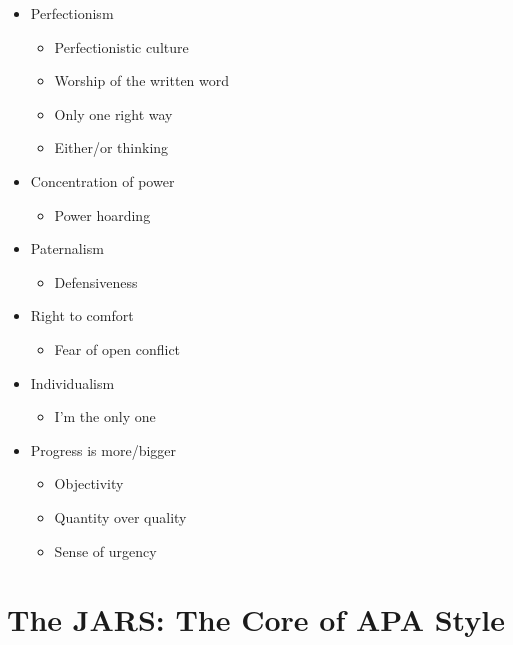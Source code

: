 \documentclass[
  11pt,
]{book}
\providecommand{\tightlist}{%
  \setlength{\itemsep}{0pt}\setlength{\parskip}{0pt}}
\begin{document}
\begin{itemize}
\tightlist
\item
  Perfectionism

  \begin{itemize}
  \tightlist
  \item
    Perfectionistic culture
  \item
    Worship of the written word
  \item
    Only one right way
  \item
    Either/or thinking
  \end{itemize}
\item
  Concentration of power

  \begin{itemize}
  \tightlist
  \item
    Power hoarding
  \end{itemize}
\item
  Paternalism

  \begin{itemize}
  \tightlist
  \item
    Defensiveness
  \end{itemize}
\item
  Right to comfort

  \begin{itemize}
  \tightlist
  \item
    Fear of open conflict
  \end{itemize}
\item
  Individualism

  \begin{itemize}
  \tightlist
  \item
    I'm the only one
  \end{itemize}
\item
  Progress is more/bigger

  \begin{itemize}
  \tightlist
  \item
    Objectivity
  \item
    Quantity over quality
  \item
    Sense of urgency
  \end{itemize}
\end{itemize}

\hypertarget{the-jars-the-core-of-apa-style}{%
\section{The JARS: The Core of APA Style}\label{the-jars-the-core-of-apa-style}}
\end{document}
